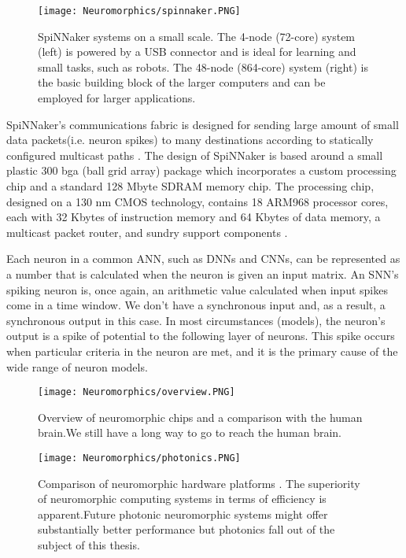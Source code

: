 \documentclass[12pt]{report}
\begin{document}
\begin{figure}[htp]
    \centering
    \texttt{[image: Neuromorphics/spinnaker.PNG]}
    \caption{SpiNNaker systems on a small scale. The 4-node (72-core) system (left) is powered by a USB connector and is ideal for learning and small tasks, such as robots. The 48-node (864-core) system (right) is the basic building block of the larger computers and can be employed for larger applications.}
    \label{fig:spinnaker}
\end{figure}

SpiNNaker's communications fabric is designed for sending large amount of small data packets(i.e. neuron spikes) to many destinations according to statically configured multicast paths \cite{plana2011}.
The design of SpiNNaker is based around a small plastic 300 bga (ball grid array) package which incorporates a custom processing chip  and a standard 128 Mbyte SDRAM memory chip. The processing chip, designed on a 130 nm CMOS technology, contains 18 ARM968 processor cores, each with 32 Kbytes of instruction memory and 64 Kbytes of data memory, a multicast packet router, and sundry support components \cite{painkras2013} \cite{furber2016}.

Each neuron in a common ANN, such as DNNs and CNNs, can be represented as a number that is calculated when the neuron is given an input matrix. An SNN's spiking neuron is, once again, an arithmetic value calculated when input spikes come in a time window. We don't have a synchronous input and, as a result, a synchronous output in this case. In most circumstances (models), the neuron's output is a spike of potential to the following layer of neurons. This spike occurs when particular criteria in the neuron are met, and it is the primary cause of the wide range of neuron models.
\begin{figure}[htp]
    \centering
    \texttt{[image: Neuromorphics/overview.PNG]}
    \caption{Overview of neuromorphic chips and a comparison with the human brain.We still have a long way to go to reach the human brain.}
    \label{fig:overview}
\end{figure}

\begin{figure}[htp]
    \centering
    \texttt{[image: Neuromorphics/photonics.PNG]}
    \caption{Comparison of neuromorphic hardware platforms . The superiority of neuromorphic computing systems in terms of efficiency is apparent.Future photonic neuromorphic systems might offer substantially better performance but photonics fall out of the subject of this thesis.\cite{shastri2018}}
    \label{fig:overview}
\end{figure}
\end{document}
